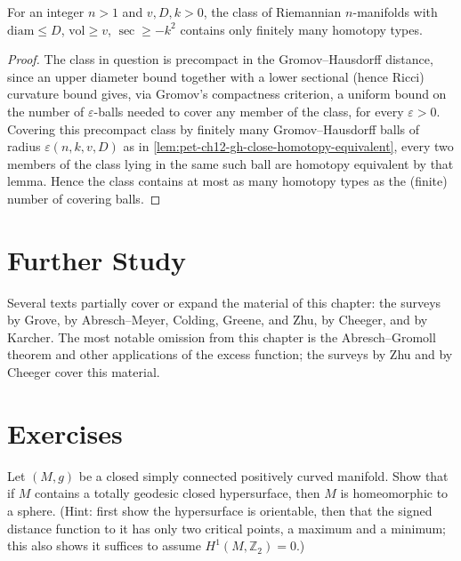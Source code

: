 \begin{theorem}
  \label{thm:pet-ch12-homotopy-finiteness}
  For an integer $n>1$ and $v,D,k>0$, the class of Riemannian $n$-manifolds with
  $\mathrm{diam}\le D$, $\mathrm{vol}\ge v$, $\sec\ge-k^2$ contains only finitely
  many homotopy types.
\end{theorem}
\begin{proof}
  The class in question is precompact in the Gromov--Hausdorff distance, since
  an upper diameter bound together with a lower sectional (hence Ricci)
  curvature bound gives, via Gromov's compactness criterion, a uniform bound on
  the number of $\varepsilon$-balls needed to cover any member of the class,
  for every $\varepsilon>0$. Covering this precompact class by finitely many
  Gromov--Hausdorff balls of radius $\varepsilon(n,k,v,D)$ as in
  \cref{lem:pet-ch12-gh-close-homotopy-equivalent}, every two members of the
  class lying in the same such ball are homotopy equivalent by that lemma.
  Hence the class contains at most as many homotopy types as the (finite)
  number of covering balls.
\end{proof}

\section{Further Study}

Several texts partially cover or expand the material of this chapter: the
surveys by Grove, by Abresch--Meyer, Colding, Greene, and Zhu, by Cheeger, and
by Karcher. The most notable omission from this chapter is the Abresch--Gromoll
theorem and other applications of the excess function; the surveys by Zhu and
by Cheeger cover this material.

\section{Exercises}

\begin{remark}[Exercise 12.8.1]
  \label{rem:pet-ch12-ex-12-8-1}
  Let $(M,g)$ be a closed simply connected positively curved manifold. Show
  that if $M$ contains a totally geodesic closed hypersurface, then $M$ is
  homeomorphic to a sphere. (Hint: first show the hypersurface is orientable,
  then that the signed distance function to it has only two critical points, a
  maximum and a minimum; this also shows it suffices to assume
  $H^1(M,\mathbb{Z}_2)=0$.)
\end{remark}

